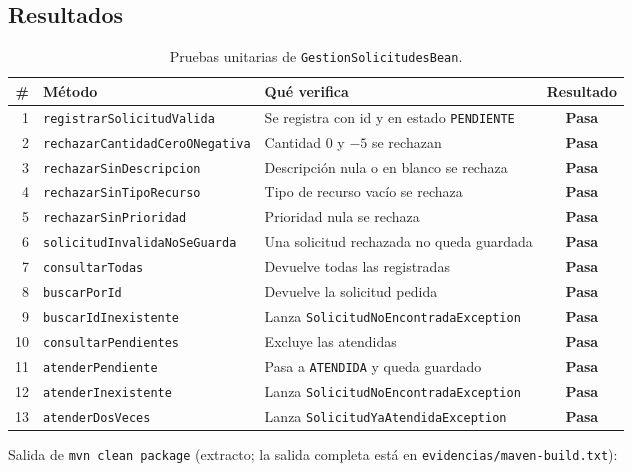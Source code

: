 \documentclass[11pt,letterpaper]{article}
\newcommand{\ok}{\textcolor{verde}{\textbf{Pasa}}}
\begin{document}
\subsection{Resultados}

\begin{table}[H]
\centering\small
\caption{Pruebas unitarias de \texttt{GestionSolicitudesBean}.}
\begin{tabularx}{\linewidth}{r l >{\raggedright\arraybackslash}X c}
\toprule
\textbf{\#} & \textbf{Método} & \textbf{Qué verifica} & \textbf{Resultado} \\
\midrule
1  & \texttt{registrarSolicitudValida}      & Se registra con id y en estado \texttt{PENDIENTE} & \ok \\
2  & \texttt{rechazarCantidadCeroONegativa} & Cantidad 0 y $-5$ se rechazan & \ok \\
3  & \texttt{rechazarSinDescripcion}        & Descripción nula o en blanco se rechaza & \ok \\
4  & \texttt{rechazarSinTipoRecurso}        & Tipo de recurso vacío se rechaza & \ok \\
5  & \texttt{rechazarSinPrioridad}          & Prioridad nula se rechaza & \ok \\
6  & \texttt{solicitudInvalidaNoSeGuarda}   & Una solicitud rechazada no queda guardada & \ok \\
7  & \texttt{consultarTodas}                & Devuelve todas las registradas & \ok \\
8  & \texttt{buscarPorId}                   & Devuelve la solicitud pedida & \ok \\
9  & \texttt{buscarIdInexistente}           & Lanza \texttt{SolicitudNoEncontradaException} & \ok \\
10 & \texttt{consultarPendientes}           & Excluye las atendidas & \ok \\
11 & \texttt{atenderPendiente}              & Pasa a \texttt{ATENDIDA} y queda guardado & \ok \\
12 & \texttt{atenderInexistente}            & Lanza \texttt{SolicitudNoEncontradaException} & \ok \\
13 & \texttt{atenderDosVeces}               & Lanza \texttt{SolicitudYaAtendidaException} & \ok \\
\bottomrule
\end{tabularx}
\end{table}

Salida de \texttt{mvn clean package} (extracto; la salida completa está en
\texttt{evidencias/maven-build.txt}):
\end{document}
